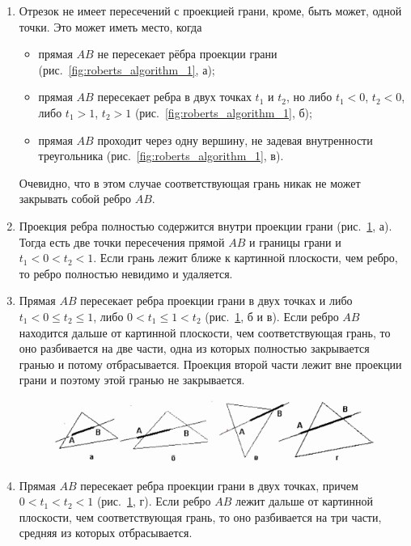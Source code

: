 \begin{enumerate}

    \item Отрезок не имеет пересечений с проекцией грани, кроме, быть может, одной точки. Это может иметь место, когда
\begin{itemize}

	\item прямая \( AB \) не пересекает рёбра проекции грани (рис.~\ref{fig:roberts_algorithm_1}, а);

    \item прямая \( AB \) пересекает ребра в двух точках \( t_1 \) и \( t_2 \), но либо \( t_1 < 0 \), \( t_2 < 0 \), либо \( t_1 > 1 \), \( t_2 > 1 \) (рис.~\ref{fig:roberts_algorithm_1}, б);
    \item прямая \( AB \) проходит через одну вершину, не задевая внутренности треугольника (рис.~\ref{fig:roberts_algorithm_1}, в).
\end{itemize}

Очевидно, что в этом случае соответствующая грань никак не может закрывать собой ребро \( AB \).

    \item Проекция ребра полностью содержится внутри проекции грани (рис.~\ref{fig:roberts_algorithm_2}, а). Тогда есть две точки пересечения прямой \( AB \) и границы грани и \( t_1 < 0 < t_2 < 1 \). Если грань лежит ближе к картинной плоскости, чем ребро, то ребро полностью невидимо и удаляется.
    
    \item Прямая \( AB \) пересекает ребра проекции грани в двух точках и либо \( t_1 < 0 \leq t_2 \leq 1 \), либо \( 0 < t_1 \leq 1 < t_2 \) (рис.~\ref{fig:roberts_algorithm_2}, б и в). Если ребро \( AB \) находится дальше от картинной плоскости, чем соответствующая грань, то оно разбивается на две части, одна из которых полностью закрывается гранью и потому отбрасывается. Проекция второй части лежит вне проекции грани и поэтому этой гранью не закрывается.
    
\begin{figure}[H]
    \centering
    \includegraphics[width=\textwidth]{img/roberts_algorithm_2.png}
    \caption{}
    \label{fig:roberts_algorithm_2}
\end{figure}    
    
    \item Прямая \( AB \) пересекает ребра проекции грани в двух точках, причем \( 0 < t_1 < t_2 < 1 \) (рис.~\ref{fig:roberts_algorithm_2}, г). Если ребро \( AB \) лежит дальше от картинной плоскости, чем соответствующая грань, то оно разбивается на три части, средняя из которых отбрасывается.

\end{enumerate}

